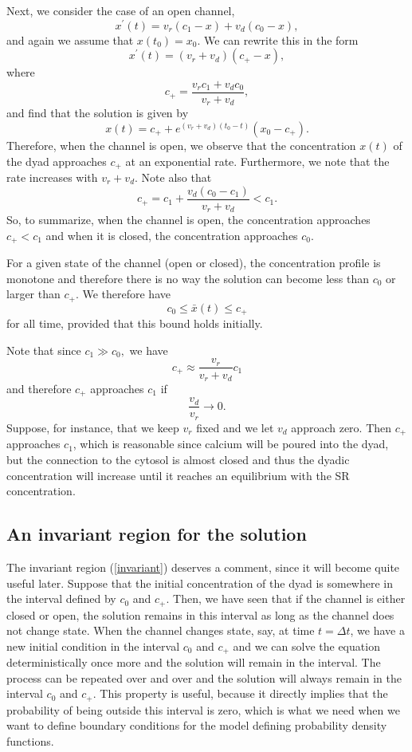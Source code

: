 Next, we consider the case of an open channel,%
\begin{equation}
x^{\prime}(t)=v_{r}(c_{1}-x)+v_{d}(c_{0}-x), \label{open600}
\end{equation}
and again we assume that $x(t_0)=x_0.$
We can rewrite this in the form%
\[
x^{\prime}(t)=(v_{r}+v_{d})\left(c_{+}-x\right),
\]
where
\[
c_{+}=\frac{v_{r}c_{1}+v_{d}c_{0}}{v_{r}+v_{d}},%
\]
and find that the solution is given by
\[
x(t)=c_{+}+e^{\left(  v_{r}+v_{d}\right)
(t_{0}-t)}\left(  x_{0}-c_{+}\right).
\]
Therefore, when the channel is open, we observe that the concentration $x(t)$ of the dyad approaches $c_{+}$
at an exponential rate. Furthermore, we note that the rate increases with $v_{r}+v_{d}$.
Note also that
\begin{equation}
c_{+}  =c_{1}+\frac{v_{d}\left(  c_{0}-c_{1}\right)  }{v_{r}+v_{d}}<c_{1}.%
\end{equation}
So, to summarize, when the channel is open, the concentration approaches  $c_+<c_1$ and when it is closed, the concentration approaches $c_0$. 

For a given state of the channel (open or closed), the concentration profile is monotone and therefore there is no way the solution
can become less than $c_0$ or larger than $c_+$. We therefore have
\begin{equation}
c_{0}\leqslant \bar{x}(t)\leqslant c_{+} \label{invariant}
\end{equation}
for all time, provided that this bound holds initially. 

Note that since $c_{1}\gg c_{0},$ we have%
\[
c_{+}\approx\frac{v_{r}}{v_{r}+v_{d}}c_{1}%
\]
and therefore $c_{+}$ approaches $c_{1}$ if 
\[\frac{v_{d}}{v_{r}}%
\longrightarrow 0.\]
 Suppose, for instance, that we keep $v_{r}$ fixed and we let $ v_{d}$ approach zero. Then 
 $c_{+}$ approaches $c_{1}$, which is reasonable since calcium will be poured into the dyad, but the connection to the cytosol is almost closed and thus the 
dyadic concentration will increase until it reaches an equilibrium with the SR concentration.

\subsection{An invariant region for the solution}

The invariant region (\ref{invariant}) deserves a comment, since it will become quite useful later. Suppose that the initial concentration of the dyad is somewhere in the interval defined by $c_0$ and $c_+$. Then, we have seen that if the channel is either closed or open, the solution remains in this interval as long as the channel does not change state. When the channel changes state, say, at time $t=\Delta t$, we have a new initial condition in the interval $c_0$ and $c_+$ and we can solve the equation deterministically once more and the solution will remain in the interval. The process can be repeated over and over and the solution will always remain in the interval $c_0$ and $c_+$. This property is useful, because it directly implies that the probability of being outside this interval is zero, which is what we need when we want to define boundary conditions for the model defining probability density functions. 

